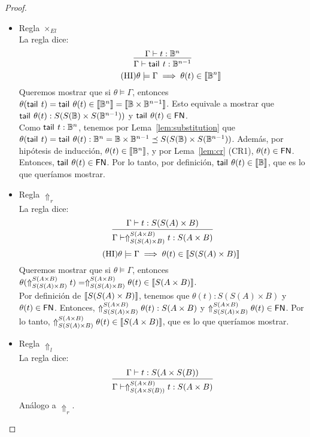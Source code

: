 \begin{proof}
\begin{itemize}
    \item Regla \( \times_{El} \)
    \\ La regla dice:
    \[ \infer{\Gamma \vdash \tail{t} : \qubittype^{n - 1}}{\Gamma \vdash t : \qubittype^n } \]
    \[ \tag{HI} \theta \models \Gamma \implies \theta(t) \in \llbracket\mathbb{B}^n\rrbracket \]
    Queremos mostrar que si \( \theta \models \Gamma \), entonces \( \theta(\mathsf{tail}^{}~t) = \mathsf{tail}^{}~\theta(t) \in \llbracket\mathbb{B}^n\rrbracket  = \llbracket\mathbb{B} \times \mathbb{B}^{n - 1}\rrbracket \). Esto equivale a mostrar que \( \mathsf{tail}^{}~\theta(t) : S(S(\mathbb{B}) \times S(\mathbb{B}^{n - 1})) \) y \( \mathsf{tail}^{}~\theta(t) \in \mathsf{FN} \).
    \\ Como \( \mathsf{tail}^{}~t : \mathbb{B}^n \), tenemos por Lema~\ref{lem:substitution} que \( \theta(\mathsf{tail}^{}~t) = \mathsf{tail}^{}~\theta(t) : \mathbb{B}^n = \mathbb{B} \times \mathbb{B}^{n - 1} \preceq S(S(\mathbb{B}) \times S(\mathbb{B}^{n - 1})) \). Además, por hipótesis de inducción, \( \theta(t) \in \llbracket\mathbb{B}^n\rrbracket \), y por Lema~\ref{lem:cr} (CR1), \( \theta(t) \in \mathsf{FN} \). Entonces, \( \mathsf{tail}^{}~\theta(t) \in \mathsf{FN} \). Por lo tanto, por definición, \( \mathsf{tail}^{}~\theta(t) \in \llbracket\mathbb{B}\rrbracket \), que es lo que queríamos mostrar.

    \item Regla \( \Uparrow_r \)
    \\ La regla dice:
    \[ \infer{\Gamma \vdash \cast{S(S(A) \times B)}{S(A \times B)} t : S(A \times B)}{\Gamma \vdash t : S(S(A) \times B)} \]
    \[ \tag{HI} \theta \models \Gamma \implies \theta(t) \in \llbracket S(S(A) \times B)\rrbracket \]
    Queremos mostrar que si \( \theta \models \Gamma \), entonces \( \theta(\Uparrow_{S(S(A) \times B)}^{S(A \times B)} t) = \Uparrow_{S(S(A) \times B)}^{S(A \times B)} \theta(t) \in \llbracket S(A \times B)\rrbracket \).
    \\ Por definición de \( \llbracket S(S(A) \times B)\rrbracket \), tenemos que \( \theta(t) : S(S(A) \times B) \) y \( \theta(t) \in \mathsf{FN} \). Entonces, \( \Uparrow_{S(S(A) \times B)}^{S(A \times B)} \theta(t) : S(A \times B) \) y \( \Uparrow_{S(S(A) \times B)}^{S(A \times B)} \theta(t) \in \mathsf{FN} \). Por lo tanto, \( \Uparrow_{S(S(A) \times B)}^{S(A \times B)} \theta(t) \in \llbracket S(A \times B)\rrbracket \), que es lo que queríamos mostrar.

    \item Regla \( \Uparrow_{l} \)
    \\ La regla dice:
    \[ \infer{\Gamma \vdash \cast{S(A \times S(B))}{S(A \times B)} t : S(A \times B)}{\Gamma \vdash t : S(A \times S(B))} \]
    Análogo a \( \Uparrow_{r} \).
    \qedhere
  \end{itemize}
\end{proof}


